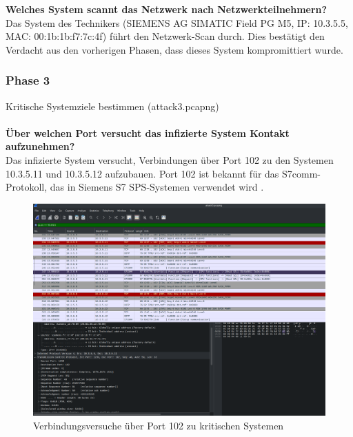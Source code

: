 \documentclass[
    a4paper,
    pagesize,
	pdftex,
    12pt,
]{scrartcl}
\begin{document}
\textbf{Welches System scannt das Netzwerk nach Netzwerkteilnehmern?}
\\
Das System des Technikers (SIEMENS AG SIMATIC Field PG M5, IP: 10.3.5.5, MAC: 00:1b:1b:f7:7c:4f) führt den Netzwerk-Scan durch. Dies bestätigt den Verdacht aus den vorherigen Phasen, dass dieses System kompromittiert wurde.

\subsubsection{Phase 3}
Kritische Systemziele bestimmen (attack3.pcapng)
\\ \\
\textbf{Über welchen Port versucht das infizierte System Kontakt aufzunehmen?}
\\
Das infizierte System versucht, Verbindungen über Port 102 zu den Systemen 10.3.5.11 und 10.3.5.12 aufzubauen. Port 102 ist bekannt für das S7comm-Protokoll, das in Siemens S7 SPS-Systemen verwendet wird  \cite{port-sps}.

\begin{figure}[H]
    \centering
    \includegraphics[width=\textwidth]{ws-port-102-connections.png}
    \caption{Verbindungsversuche über Port 102 zu kritischen Systemen}
    \label{fig:ws-port-102-connections}
\end{figure}
\end{document}
